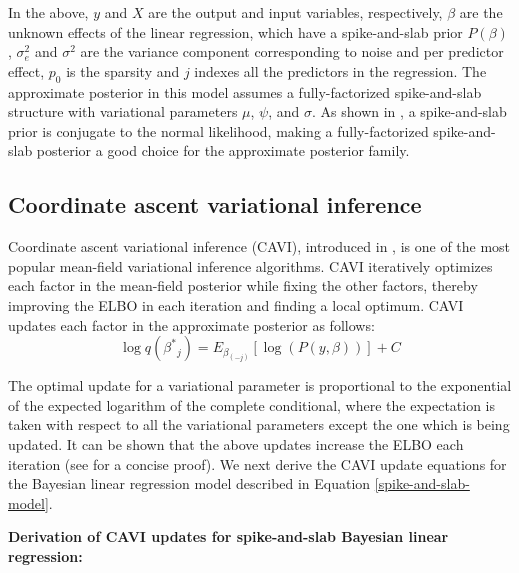 In the above, $y$ and $X$ are the output and input variables, respectively, $\beta$ are the unknown effects of the linear regression, which have a spike-and-slab prior $P(\beta)$, $\sigma_e^2$ and $\sigma^2$ are the variance component corresponding to noise and per predictor effect, $p_0$ is the sparsity and $j$ indexes all the predictors in the regression.
%
The approximate posterior in this model assumes a fully-factorized spike-and-slab structure with variational parameters $\mu$, $\psi$, and $\sigma$.
%
As shown in \cite{spence2020flexible}, a spike-and-slab prior is conjugate to the normal likelihood, making a fully-factorized spike-and-slab posterior a good choice for the approximate posterior family. 

\subsection{Coordinate ascent variational inference}
Coordinate ascent variational inference (CAVI), introduced in \cite{bishop2006pattern}, is one of the most popular mean-field variational inference algorithms.
%
CAVI iteratively optimizes each factor in the mean-field posterior while fixing the other factors, thereby improving the ELBO in each iteration and finding a local optimum.
%
CAVI updates each factor in the approximate posterior as follows:
\begin{equation}
    \log q(\beta^{*}{_j}) = E_{\beta_{(-j)}} [\log(P(y, \beta))] + C \label{cavi}
\end{equation}

%
The optimal update for a variational parameter is proportional to the exponential of the expected logarithm of the complete conditional, where the expectation is taken with respect to all the variational parameters except the one which is being updated.
%
It can be shown that the above updates increase the ELBO each iteration (see \cite{blei2017variational} for a concise proof).
%
We next derive the CAVI update equations for the Bayesian linear regression model described in Equation \ref{spike-and-slab-model}.


\noindent \textbf{Derivation of CAVI updates for spike-and-slab Bayesian linear regression:}

